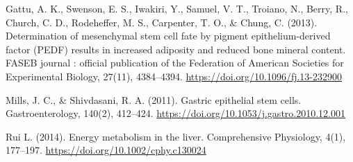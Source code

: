 \documentclass[
]{article}
\begin{document}
Gattu, A. K., Swenson, E. S., Iwakiri, Y., Samuel, V. T., Troiano, N.,
Berry, R., Church, C. D., Rodeheffer, M. S., Carpenter, T. O., \& Chung,
C. (2013). Determination of mesenchymal stem cell fate by pigment
epithelium-derived factor (PEDF) results in increased adiposity and
reduced bone mineral content. FASEB journal : official publication of
the Federation of American Societies for Experimental Biology, 27(11),
4384--4394. \url{https://doi.org/10.1096/fj.13-232900}

Mills, J. C., \& Shivdasani, R. A. (2011). Gastric epithelial stem
cells. Gastroenterology, 140(2), 412--424.
\url{https://doi.org/10.1053/j.gastro.2010.12.001}

Rui L. (2014). Energy metabolism in the liver. Comprehensive Physiology,
4(1), 177--197. \url{https://doi.org/10.1002/cphy.c130024}
\end{document}
